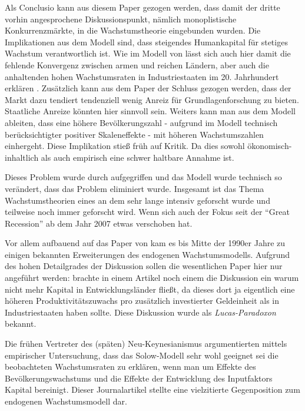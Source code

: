 Als Conclusio kann aus diesem Paper gezogen werden, dass damit der dritte vorhin angesprochene Diskussionspunkt, nämlich monoplistische Konkurrenzmärkte, in die Wachstumstheorie eingebunden wurden. Die Implikationen aus dem Modell sind, dass steigendes Humankapital für stetiges Wachstum verantwortlich ist. Wie im Modell von \textcite{Lucas1988} lässt sich auch hier damit die fehlende Konvergenz zwischen armen und reichen Ländern, aber auch die anhaltenden hohen Wachstumsraten in Industriestaaten im 20. Jahrhundert erklären \parencite{Romer1990}. Zusätzlich kann aus dem Paper der Schluss gezogen werden, dass der Markt dazu tendiert tendenziell wenig Anreiz für Grundlagenforschung zu bieten. Staatliche Anreize könnten hier sinnvoll sein. Weiters kann man aus dem Modell ableiten, dass eine höhere Bevölkerungszahl - aufgrund im Modell technisch berücksichtigter positiver Skaleneffekte - mit höheren Wachstumszahlen einhergeht. Diese Implikation stieß früh auf Kritik. Da dies sowohl ökonomisch-inhaltlich als auch empirisch eine schwer haltbare Annahme ist.

Dieses Problem wurde durch \textcite{Jones1995} aufgegriffen und das Modell wurde technisch so verändert, dass das Problem eliminiert wurde. Insgesamt ist das Thema Wachstumstheorien eines an dem sehr lange intensiv geforscht wurde und teilweise noch immer geforscht wird. Wenn sich auch der Fokus seit der "`Great Recession"' ab dem Jahr 2007 etwas verschoben hat.

Vor allem aufbauend auf das Paper von \textcite{Romer1990} kam es bis Mitte der 1990er Jahre zu einigen bekannten Erweiterungen des endogenen Wachstumsmodells. Aufgrund des hohen Detailgrades der Diskussion sollen die wesentlichen Paper hier nur angeführt werden: \textcite{Lucas1990} brachte in einem Artikel noch einem die Diskussion ein warum nicht mehr Kapital in Entwicklungsländer fließt, da dieses dort ja eigentlich eine höheren Produktivitätszuwachs pro zusätzlich investierter Geldeinheit als in Industriestaaten haben sollte. Diese Diskussion wurde als \textit{Lucas-Paradoxon} bekannt.

Die frühen Vertreter des (späten) Neu-Keynesianismus \textcite{Mankiw1992} argumentierten mittels empirischer Untersuchung, dass das Solow-Modell sehr wohl geeignet sei die beobachteten Wachstumsraten zu erklären, wenn man um Effekte des Bevölkerungswachstums und die Effekte der Entwicklung des Inputfaktors Kapital bereinigt. Dieser Journalartikel stellte eine vielzitierte Gegenposition zum endogenen Wachstumsmodell dar. 

